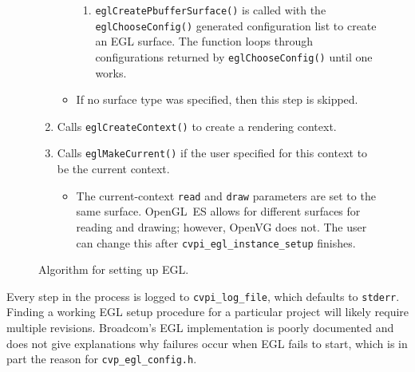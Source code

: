\documentclass[12pt]{report}
\begin{document}
\begin{figure}[H]
\begin{mdframed}[style=default]
\begin{enumerate}
\begin{itemize}
\begin{enumerate}
\item {\tt eglCreatePbufferSurface()} is called with the {\tt eglChooseConfig()}
generated configuration list to create an EGL surface. The
function loops through configurations returned by
{\tt eglChooseConfig()} until one works.
\end{enumerate}
\item If no surface type was specified, then this step is skipped.
\end{itemize}
\item Calls {\tt eglCreateContext()} to create a rendering context.
\item Calls {\tt eglMakeCurrent()} if the user specified for this context
to be the current context.
\begin{itemize}
\item The current-context {\tt read} and {\tt draw} parameters are set
  to the same surface. OpenGL~ES allows for different surfaces for
  reading and drawing; however, OpenVG does not. The user can change
  this after {\tt cvpi\_egl\_instance\_setup} finishes.
\end{itemize}
\end{enumerate}
\end{mdframed}
\caption{Algorithm for setting up EGL.}
\end{figure}

Every step in the process is logged to {\tt cvpi\_log\_file}, which
defaults to {\tt stderr}.  Finding a working EGL setup procedure for a
particular project will likely require multiple revisions. Broadcom's
EGL implementation is poorly documented and does not give explanations
why failures occur when EGL fails to start, which is in part the
reason for {\tt cvp\_egl\_config.h}.
\end{document}
